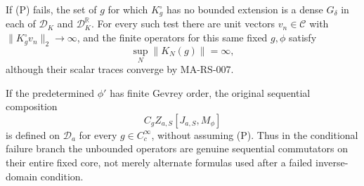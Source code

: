 If (P) fails, the set of \(g\) for which
\(K^\circ_g\) has no bounded extension is a dense
\(G_\delta\) in each of \(\mathscr D_K\) and
\(\mathscr D_K^\mathbb R\).  For every such test
there are unit vectors \(v_n\in\mathscr C\)
with \(\|K^\circ_gv_n\|_2\to\infty\), and the
finite operators for this same fixed \(g,\phi\)
satisfy
\[
                   \sup_N\|K_N(g)\|=\infty ,
\tag{MA-MO.1104}
\]
although their scalar traces converge by MA-RS-007.

If the predetermined \(\phi'\) has finite Gevrey
order, the original sequential composition
\[
                C_gZ_{a,S}[J_{a,S},M_\phi]
\tag{MA-MO.1105}
\]
is defined on \(\mathscr D_a\) for every
\(g\in C_c^\infty\), without assuming (P).
Thus in the conditional failure branch the
unbounded operators are genuine sequential
commutators on their entire fixed core, not
merely alternate formulas used after a failed
inverse-domain condition.

